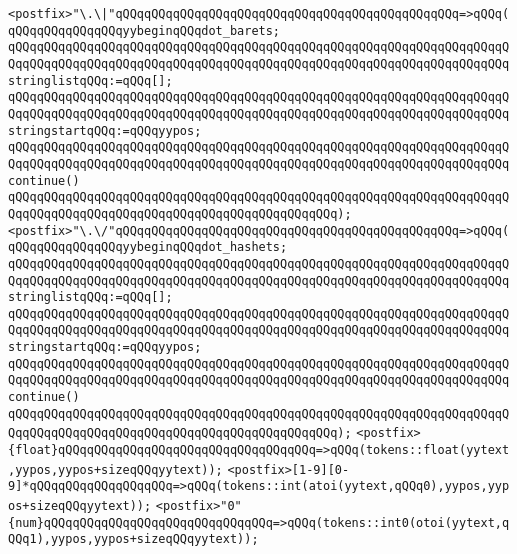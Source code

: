 \newline
\verb|<postfix>"\.\|\verb#|"qQQqqQQqqQQqqQQqqQQqqQQqqQQqqQQqqQQqqQQqqQQqqQQq=>qQQq(qQQqqQQqqQQqqQQqyybeginqQQqdot_barets;#\newline
\verb|qQQqqQQqqQQqqQQqqQQqqQQqqQQqqQQqqQQqqQQqqQQqqQQqqQQqqQQqqQQqqQQqqQQqqQQqqQQqqQQqqQQqqQQqqQQqqQQqqQQqqQQqqQQqqQQqqQQqqQQqqQQqqQQqqQQqqQQqqQQqstringlistqQQq:=qQQq[];|\newline
\verb|qQQqqQQqqQQqqQQqqQQqqQQqqQQqqQQqqQQqqQQqqQQqqQQqqQQqqQQqqQQqqQQqqQQqqQQqqQQqqQQqqQQqqQQqqQQqqQQqqQQqqQQqqQQqqQQqqQQqqQQqqQQqqQQqqQQqqQQqqQQqstringstartqQQq:=qQQqyypos;|\newline
\verb|qQQqqQQqqQQqqQQqqQQqqQQqqQQqqQQqqQQqqQQqqQQqqQQqqQQqqQQqqQQqqQQqqQQqqQQqqQQqqQQqqQQqqQQqqQQqqQQqqQQqqQQqqQQqqQQqqQQqqQQqqQQqqQQqqQQqqQQqqQQqcontinue()|\newline
\verb|qQQqqQQqqQQqqQQqqQQqqQQqqQQqqQQqqQQqqQQqqQQqqQQqqQQqqQQqqQQqqQQqqQQqqQQqqQQqqQQqqQQqqQQqqQQqqQQqqQQqqQQqqQQqqQQqqQQq);|\newline
\newline
\verb|<postfix>"\.\/"qQQqqQQqqQQqqQQqqQQqqQQqqQQqqQQqqQQqqQQqqQQqqQQq=>qQQq(qQQqqQQqqQQqqQQqyybeginqQQqdot_hashets;|\newline
\verb|qQQqqQQqqQQqqQQqqQQqqQQqqQQqqQQqqQQqqQQqqQQqqQQqqQQqqQQqqQQqqQQqqQQqqQQqqQQqqQQqqQQqqQQqqQQqqQQqqQQqqQQqqQQqqQQqqQQqqQQqqQQqqQQqqQQqqQQqqQQqstringlistqQQq:=qQQq[];|\newline
\verb|qQQqqQQqqQQqqQQqqQQqqQQqqQQqqQQqqQQqqQQqqQQqqQQqqQQqqQQqqQQqqQQqqQQqqQQqqQQqqQQqqQQqqQQqqQQqqQQqqQQqqQQqqQQqqQQqqQQqqQQqqQQqqQQqqQQqqQQqqQQqstringstartqQQq:=qQQqyypos;|\newline
\verb|qQQqqQQqqQQqqQQqqQQqqQQqqQQqqQQqqQQqqQQqqQQqqQQqqQQqqQQqqQQqqQQqqQQqqQQqqQQqqQQqqQQqqQQqqQQqqQQqqQQqqQQqqQQqqQQqqQQqqQQqqQQqqQQqqQQqqQQqqQQqcontinue()|\newline
\verb|qQQqqQQqqQQqqQQqqQQqqQQqqQQqqQQqqQQqqQQqqQQqqQQqqQQqqQQqqQQqqQQqqQQqqQQqqQQqqQQqqQQqqQQqqQQqqQQqqQQqqQQqqQQqqQQqqQQq);|\newline
\newline
\verb|<postfix>{float}qQQqqQQqqQQqqQQqqQQqqQQqqQQqqQQqqQQq=>qQQq(tokens::float(yytext,yypos,yypos+sizeqQQqyytext));|\newline
\verb|<postfix>[1-9][0-9]*qQQqqQQqqQQqqQQqqQQq=>qQQq(tokens::int(atoi(yytext,qQQq0),yypos,yypos+sizeqQQqyytext));|\newline
\verb|<postfix>"0"{num}qQQqqQQqqQQqqQQqqQQqqQQqqQQqqQQq=>qQQq(tokens::int0(otoi(yytext,qQQq1),yypos,yypos+sizeqQQqyytext));|\newline
